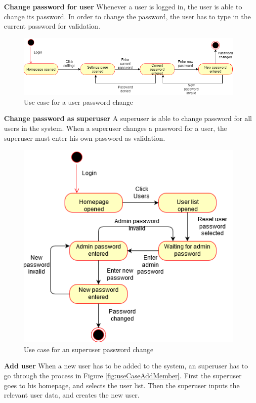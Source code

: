 \noindent
\textbf{Change password for user}\newline
Whenever a user is logged in, the user is able to change its password. In order to change the password, the user has to type in the current password for validation.
\begin{figure}[H]
    \centering
    \includegraphics[scale=0.6, clip]{figures/useCaseMemberChangePassword.png}
    \caption{Use case for a user password change}
    \label{fig:useCaseMemberChangePassword}
\end{figure}
\noindent
\textbf{Change password as superuser}\newline
A superuser is able to change password for all users in the system. When a superuser changes a password for a user, the superuser must enter his own password as validation. 
\begin{figure}[H]
    \centering
    \includegraphics[scale=0.6, clip]{figures/useCaseChangePasswordAdmin.png}
    \caption{Use case for an superuser password change}
    \label{fig:useCaseAdminChangePassword}
\end{figure}
\noindent
\textbf{Add user}\newline
When a new user has to be added to the system, an superuser has to go through the process in Figure \ref{fig:useCaseAddMember}. First the superuser goes to his homepage, and selects the user list. Then the superuser inputs the relevant user data, and creates the new user.
